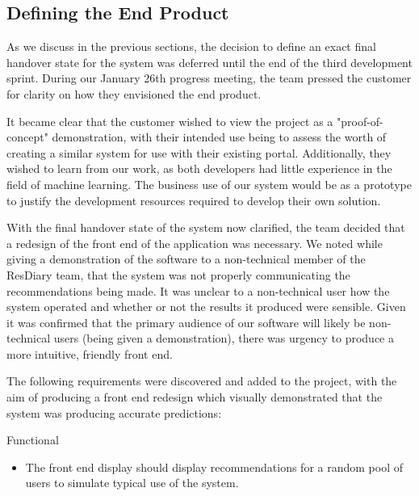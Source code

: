 \documentclass{l3proj}
\begin{document}
\newpage
\subsection{Defining the End Product}
\label{sec:jandefinedstate}

As we discuss in the previous sections, the decision to define an exact final handover state for the system was deferred until the end of the third development sprint. During our January 26th progress meeting, the team pressed the customer for clarity on how they envisioned the end product. 

It became clear that the customer wished to view the project as a "proof-of-concept" demonstration, with their intended use being to assess the worth of creating a similar system for use with their existing portal. Additionally, they wished to learn from our work, as both developers had little experience in the field of machine learning. The business use of our system would be as a prototype to justify the development resources required to develop their own solution.

With the final handover state of the system now clarified, the team decided that a redesign of the front end of the application was necessary. We noted while giving a demonstration of the software to a non-technical member of the ResDiary team, that the system was not properly communicating the recommendations being made. It was unclear to a non-technical user how the system operated and whether or not the results it produced were sensible. Given it was confirmed that the primary audience of our software will likely be non-technical users (being given a demonstration), there was urgency to produce a more intuitive, friendly front end. 

The following requirements were discovered and added to the project, with the aim of producing a front end redesign which visually demonstrated that the system was producing accurate predictions:

Functional
\begin{itemize}
\item The front end display should display recommendations for a random pool of users to simulate typical use of the system.
\end{itemize}
\end{document}

